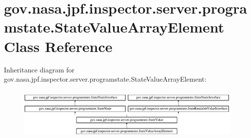 \hypertarget{classgov_1_1nasa_1_1jpf_1_1inspector_1_1server_1_1programstate_1_1_state_value_array_element}{}\section{gov.\+nasa.\+jpf.\+inspector.\+server.\+programstate.\+State\+Value\+Array\+Element Class Reference}
\label{classgov_1_1nasa_1_1jpf_1_1inspector_1_1server_1_1programstate_1_1_state_value_array_element}
Inheritance diagram for gov.\+nasa.\+jpf.\+inspector.\+server.\+programstate.\+State\+Value\+Array\+Element\+:\begin{figure}[H]
\begin{center}
\leavevmode
\includegraphics[height=2.592592cm]{classgov_1_1nasa_1_1jpf_1_1inspector_1_1server_1_1programstate_1_1_state_value_array_element}
\end{center}
\end{figure}
